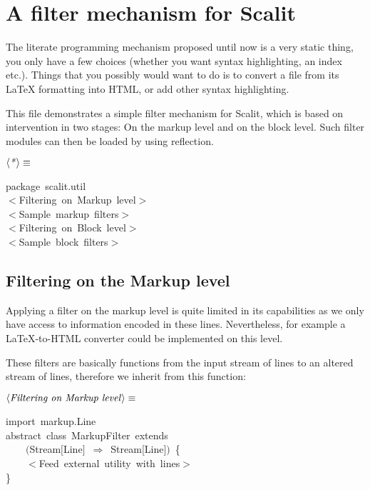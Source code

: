 \documentclass[a4paper,12pt]{article}
\begin{document}
\section{A filter mechanism for Scalit}
The literate programming mechanism proposed until now is a very static thing,
you only have a few choices (whether you want syntax highlighting, an index
etc.). Things that you possibly would want to do is to convert a file from
its LaTeX formatting into HTML, or add other syntax highlighting.

This file demonstrates a simple filter mechanism for Scalit, which is
based on intervention in two stages: On the markup level and on the
block level. Such filter modules can then be loaded by using reflection.

$\left<\mbox{\emph{*}}\right>\equiv$
\begin{program}{\vem package}~scalit.util
\\[0.5em]$<$Filtering~on~Markup~level$>$
\\[0.5em]$<$Sample~markup~filters$>$
\\[0.5em]$<$Filtering~on~Block~level$>$
\\[0.5em]$<$Sample~block~filters$>$
\\[0.5em]\end{program}


\subsection{Filtering on the Markup level}
Applying a filter on the markup level is quite limited in its capabilities
as we only have access to information encoded in these lines. Nevertheless,
for example a LaTeX-to-HTML converter could be implemented on this level.

These filters are basically functions from the input stream of lines to
an altered stream of lines, therefore we inherit from this function:

$\left<\mbox{\emph{Filtering on Markup level}}\right>\equiv$
\begin{program}{\vem import}~markup.Line
\\{\vem abstract}~{\vem class}~MarkupFilter~{\vem extends}
\\~~~~$($Stream$[$Line$]$~$\Rightarrow$~Stream$[$Line$]$$)$~{\small\{}
\\~~~~$<$Feed~external~utility~{\vem with}~lines$>$
\\{\small\}}
\\[0.5em]\end{program}
\end{document}
